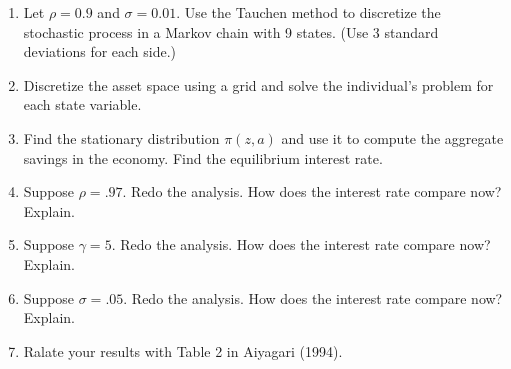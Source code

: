 \documentclass[10pt]{article}
\newcommand\0{\mathbf{0}}
\newcounter{exercise}
\newcounter{problem}[exercise]
\begin{document}
\begin{enumerate}[wide, label = \arabic*.]

\item Let $\rho = 0.9$ and $\sigma = 0.01$. Use the Tauchen method to discretize the stochastic process in a Markov chain with 9 states. (Use 3 standard deviations for each side.)


\item Discretize the asset space using a grid and solve the individual's problem for each state variable. 


\item Find the stationary distribution $\pi(z,a)$ and use it to compute the aggregate savings in the economy. Find the equilibrium interest rate.


\item Suppose $\rho = .97$. Redo the analysis. How does the interest rate compare now? Explain.


\item Suppose $\gamma = 5$. Redo the analysis. How does the interest rate compare now? Explain.


\item Suppose $\sigma = .05$. Redo the analysis. How does the interest rate compare now? Explain. 


\item Ralate your results with Table 2 in Aiyagari (1994). 

\end{enumerate}
\end{document}
